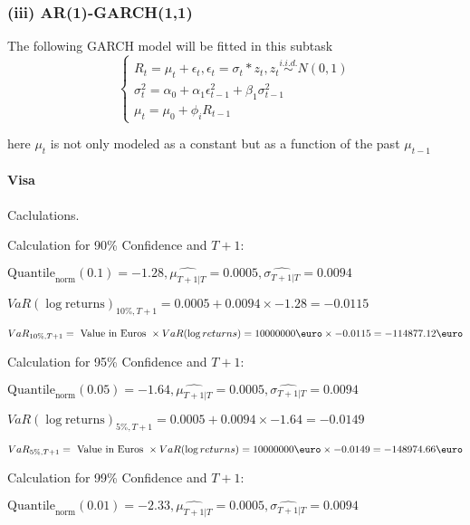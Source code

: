 \subsubsection{(iii) AR(1)-GARCH(1,1)}
The following GARCH model will be fitted in this subtask
$$\begin{cases} R_t = \mu_t + \epsilon_t, \epsilon_t = \sigma_t  * z_t, z_t \overset{i.i.d.}{\sim} N(0,1) \\ \sigma^2_t = \alpha_0 + \alpha_1 \epsilon^2_{t-1} + \beta_1 \sigma^2_{t-1} \\ \mu_t = \mu_0 + \phi_i R_{t-1} \end{cases}$$ 


here $\mu_t$ is not only modeled as a constant but as a function of the past $\mu_{t-1}$
\paragraph{Visa} Caclulations.\newline \indent 




Calculation for 90\% Confidence and $T+1$:

\indent\indent $\text{Quantile}_\text{norm}(0.1) = -1.28,\hat{\mu_{T+1|T}} = 0.0005, \hat{\sigma_{T+1|T}} = 0.0094$

\indent\indent $VaR(\log \text{returns})_{10\%, T + 1} = 0.0005 + 0.0094\times-1.28 = -0.0115$

\indent\indent $VaR_{10\%, T + 1} = \text{ Value in Euros } \times VaR(\log returns) = 10 000 000 \text{\euro} \times-0.0115 = -114877.12 \text{\euro}$\newline




Calculation for 95\% Confidence and $T+1$:

\indent\indent $\text{Quantile}_\text{norm}(0.05) = -1.64,\hat{\mu_{T+1|T}} = 0.0005, \hat{\sigma_{T+1|T}} = 0.0094$

\indent\indent $VaR(\log \text{returns})_{5\%, T + 1} = 0.0005 + 0.0094\times-1.64 = -0.0149$

\indent\indent $VaR_{5\%, T + 1} = \text{ Value in Euros } \times VaR(\log returns) = 10 000 000 \text{\euro} \times-0.0149 = -148974.66 \text{\euro}$\newline




Calculation for 99\% Confidence and $T+1$:

\indent\indent $\text{Quantile}_\text{norm}(0.01) = -2.33,\hat{\mu_{T+1|T}} = 0.0005, \hat{\sigma_{T+1|T}} = 0.0094$

